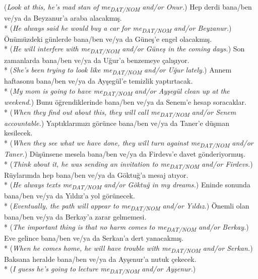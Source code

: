 ({\it Look at this, he's mad stan of me\textsubscript{DAT/NOM} and/or Onur.})
\ex Hep derdi bana/ben ve/ya da Beyzanur'a araba alacakm{\i}\c{s}. \\*
({\it He always said he would buy a car for me\textsubscript{DAT/NOM} and/or Beyzanur.})
\ex \"{O}n\"{u}m\"{u}zdeki g\"{u}nlerde bana/ben ve/ya da G\"{u}ne\c{s}'e engel olacakm{\i}\c{s}. \\*
({\it He will interfere with me\textsubscript{DAT/NOM} and/or G\"{u}ne\c{s} in the coming days.})
\ex Son zamanlarda bana/ben ve/ya da U\u{g}ur'a benzemeye \c{c}al{\i}\c{s}{\i}yor. \\*
({\it She's been trying to look like me\textsubscript{DAT/NOM} and/or Uğur lately.})
\ex Annem haftasonu bana/ben ve/ya da Ay\c{s}eg\"{u}l'e temizlik yapt{\i}rtacak. \\*
({\it My mom is going to have me\textsubscript{DAT/NOM} and/or Ayşegül clean up at the weekend.})
\ex Bunu \"{o}\u{g}rendiklerinde bana/ben ve/ya da Senem'e hesap soracaklar. \\*
({\it When they find out about this, they will call me\textsubscript{DAT/NOM} and/or Senem accountable.})
\ex Yapt{\i}klar{\i}m{\i}z{\i} g\"{o}r\"{u}nce bana/ben ve/ya da Taner'e d\"{u}\c{s}man kesilecek. \\*
({\it When they see what we have done, they will turn against me\textsubscript{DAT/NOM} and/or Taner.})
\ex D\"{u}\c{s}\"{u}nsene mesela bana/ben ve/ya da Firdevs'e davet g\"{o}nderiyormu\c{s}. \\*
({\it Think about it, he was sending an invitation to me\textsubscript{DAT/NOM} and/or Firdevs.})
\ex R\"{u}ylar{\i}mda hep bana/ben ve/ya da G\"{o}ktu\u{g}'a mesaj at{\i}yor. \\*
({\it He always texts me\textsubscript{DAT/NOM} and/or Göktuğ in my dreams.})
\ex Eninde sonunda bana/ben ve/ya da Y{\i}ld{\i}z'a yol g\"{o}r\"{u}necek. \\*
({\it Eventually, the path will appear to me\textsubscript{DAT/NOM} and/or Y{\i}ld{\i}z.})
\ex \"{O}nemli olan bana/ben ve/ya da Berkay'a zarar gelmemesi. \\*
({\it The important thing is that no harm comes to me\textsubscript{DAT/NOM} and/or Berkay.})
\ex Eve gelince bana/ben ve/ya da Serkan'a dert yanacakm{\i}\c{s}. \\*
({\it When he comes home, he will have trouble with me\textsubscript{DAT/NOM} and/or Serkan.})
\ex Baksana heralde bana/ben ve/ya da Ay\c{s}enur'a nutuk \c{c}ekecek. \\*
({\it I guess he's going to lecture me\textsubscript{DAT/NOM} and/or Ayşenur.})
